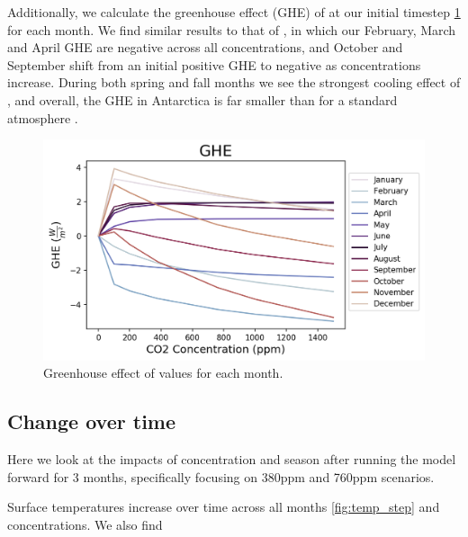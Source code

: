\documentclass[12]{article}
\begin{document}
Additionally, we calculate the greenhouse effect (GHE) of  at our initial timestep \ref{fig:GHE} for each month. We find similar results to that of \citep{schmithusen_how_2015}, in which our February, March and April GHE are negative across all  concentrations, and October and September shift from an initial positive GHE to negative as concentrations increase. During both spring and fall months we see the strongest cooling effect of , and overall, the GHE in Antarctica is far smaller than for a standard atmosphere \citep{schmithusen_how_2015}.

\begin{figure}[htb!]
\noindent\includegraphics[width=.8\textwidth]{figures/GHE.png}
\centering
\caption{Greenhouse effect of  values for each month.}
\label{fig:GHE}
\end{figure}

\subsection{Change over time}
Here we look at the impacts of  concentration and season after running the model forward for 3 months, specifically focusing on 380ppm and 760ppm scenarios. 

Surface temperatures increase over time across all months \ref{fig:temp_step} and  concentrations. We also find 
\end{document}
